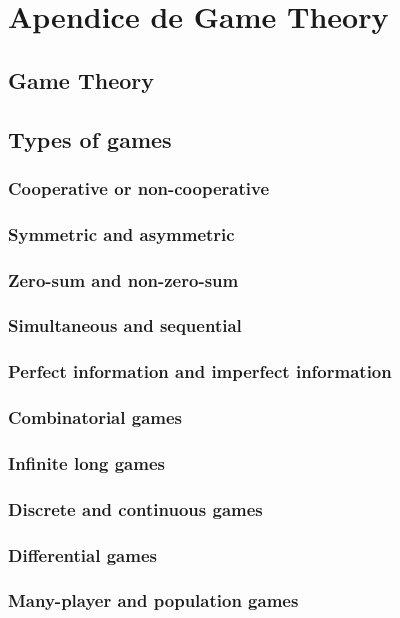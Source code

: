 \chapter{Apendice de Game Theory}
    \section{Game Theory} 
    \section{Types of games}
        \subsection{Cooperative or non-cooperative}
        \subsection{Symmetric and asymmetric}
        \subsection{Zero-sum and non-zero-sum}
        \subsection{Simultaneous and sequential}   
        \subsection{Perfect information and imperfect information}
        \subsection{Combinatorial games}
        \subsection{Infinite long games}
        \subsection{Discrete and continuous games}
        \subsection{Differential games}
        \subsection{Many-player and population games}
